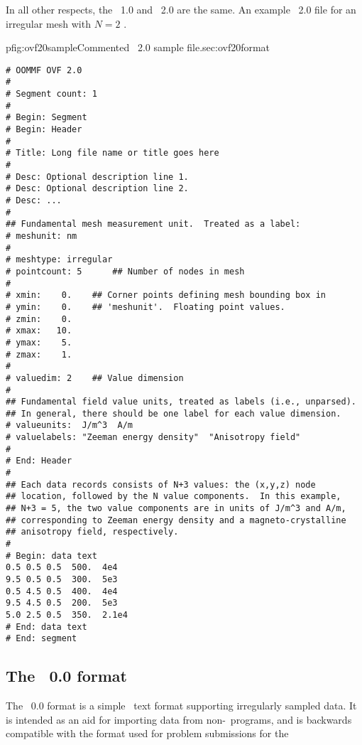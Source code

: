 In all other respects, the \OVF~1.0 and \OVF~2.0 are the same.  An
example \OVF~2.0 file for an irregular mesh with $N=2$
.

\begin{codelisting}{p}{fig:ovf20sample}{Commented \OVF~2.0 sample
file.}{sec:ovf20format}
\begin{verbatim}
# OOMMF OVF 2.0
#
# Segment count: 1
#
# Begin: Segment
# Begin: Header
#
# Title: Long file name or title goes here
#
# Desc: Optional description line 1.
# Desc: Optional description line 2.
# Desc: ...
#
## Fundamental mesh measurement unit.  Treated as a label:
# meshunit: nm
#
# meshtype: irregular
# pointcount: 5      ## Number of nodes in mesh
#
# xmin:    0.    ## Corner points defining mesh bounding box in
# ymin:    0.    ## 'meshunit'.  Floating point values.
# zmin:    0.
# xmax:   10.
# ymax:    5.
# zmax:    1.
#
# valuedim: 2    ## Value dimension
#
## Fundamental field value units, treated as labels (i.e., unparsed).
## In general, there should be one label for each value dimension.
# valueunits:  J/m^3  A/m
# valuelabels: "Zeeman energy density"  "Anisotropy field"
#
# End: Header
#
## Each data records consists of N+3 values: the (x,y,z) node
## location, followed by the N value components.  In this example,
## N+3 = 5, the two value components are in units of J/m^3 and A/m,
## corresponding to Zeeman energy density and a magneto-crystalline
## anisotropy field, respectively.
#
# Begin: data text
0.5 0.5 0.5  500.  4e4
9.5 0.5 0.5  300.  5e3
0.5 4.5 0.5  400.  4e4
9.5 4.5 0.5  200.  5e3
5.0 2.5 0.5  350.  2.1e4
# End: data text
# End: segment
\end{verbatim}
\end{codelisting}


\subsection{The \OVF\ 0.0 format}\label{sec:svfformat}

The \OVF\ 0.0 format is a simple \ASCII\ text
format supporting irregularly sampled data.  It is intended as an aid
for importing data from non-\OOMMF\ programs, and is backwards
compatible with the format used for problem submissions for the


